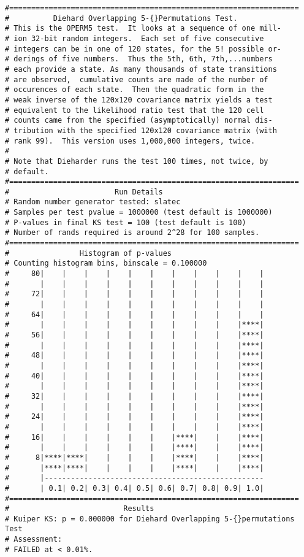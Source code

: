 \documentclass{book}
\begin{document}
{\begin{verbatim}
#==================================================================
#          Diehard Overlapping 5-{}Permutations Test.
# This is the OPERM5 test.  It looks at a sequence of one mill- 
# ion 32-bit random integers.  Each set of five consecutive     
# integers can be in one of 120 states, for the 5! possible or- 
# derings of five numbers.  Thus the 5th, 6th, 7th,...numbers   
# each provide a state. As many thousands of state transitions  
# are observed,  cumulative counts are made of the number of    
# occurences of each state.  Then the quadratic form in the     
# weak inverse of the 120x120 covariance matrix yields a test   
# equivalent to the likelihood ratio test that the 120 cell     
# counts came from the specified (asymptotically) normal dis-   
# tribution with the specified 120x120 covariance matrix (with  
# rank 99).  This version uses 1,000,000 integers, twice.       
#
# Note that Dieharder runs the test 100 times, not twice, by
# default.
#==================================================================
#                        Run Details
# Random number generator tested: slatec
# Samples per test pvalue = 1000000 (test default is 1000000)
# P-values in final KS test = 100 (test default is 100)
# Number of rands required is around 2^28 for 100 samples.
#==================================================================
#                Histogram of p-values
# Counting histogram bins, binscale = 0.100000
#     80|    |    |    |    |    |    |    |    |    |    |
#       |    |    |    |    |    |    |    |    |    |    |
#     72|    |    |    |    |    |    |    |    |    |    |
#       |    |    |    |    |    |    |    |    |    |    |
#     64|    |    |    |    |    |    |    |    |    |    |
#       |    |    |    |    |    |    |    |    |    |****|
#     56|    |    |    |    |    |    |    |    |    |****|
#       |    |    |    |    |    |    |    |    |    |****|
#     48|    |    |    |    |    |    |    |    |    |****|
#       |    |    |    |    |    |    |    |    |    |****|
#     40|    |    |    |    |    |    |    |    |    |****|
#       |    |    |    |    |    |    |    |    |    |****|
#     32|    |    |    |    |    |    |    |    |    |****|
#       |    |    |    |    |    |    |    |    |    |****|
#     24|    |    |    |    |    |    |    |    |    |****|
#       |    |    |    |    |    |    |    |    |    |****|
#     16|    |    |    |    |    |    |****|    |    |****|
#       |    |    |    |    |    |    |****|    |    |****|
#      8|****|****|    |    |    |    |****|    |    |****|
#       |****|****|    |    |    |    |****|    |    |****|
#       |--------------------------------------------------
#       | 0.1| 0.2| 0.3| 0.4| 0.5| 0.6| 0.7| 0.8| 0.9| 1.0|
#==================================================================
#                          Results
# Kuiper KS: p = 0.000000 for Diehard Overlapping 5-{}permutations Test
# Assessment:
# FAILED at < 0.01%.


\end{verbatim}}
\end{document}
